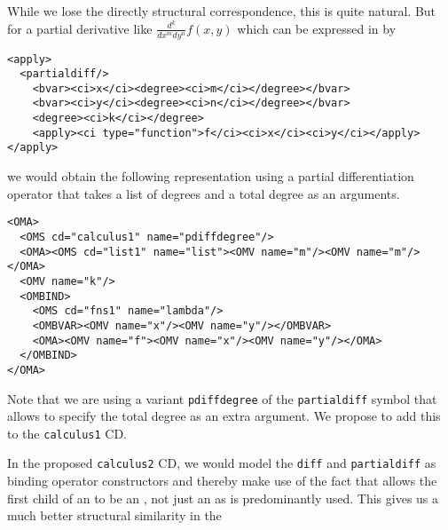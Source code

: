 \documentclass{llncs}
\begin{document}
While we lose the directly structural correspondence, this is quite natural. But for a
partial derivative like $\frac{d^k}{dx^m dy^n}f(x,y)$ which can be expressed in {\mathml}
by

\begin{lstlisting}[language=MathML2]
<apply>
  <partialdiff/>
    <bvar><ci>x</ci><degree><ci>m</ci></degree></bvar>
    <bvar><ci>y</ci><degree><ci>n</ci></degree></bvar>
    <degree><ci>k</ci></degree>
    <apply><ci type="function">f</ci><ci>x</ci><ci>y</ci></apply>
</apply>
\end{lstlisting}
we would obtain the following representation using a partial differentiation operator that
takes a list of degrees and a total degree as an arguments.
\begin{lstlisting}[language=OpenMath]
<OMA>
  <OMS cd="calculus1" name="pdiffdegree"/>
  <OMA><OMS cd="list1" name="list"><OMV name="m"/><OMV name="m"/></OMA>
  <OMV name="k"/>
  <OMBIND>
    <OMS cd="fns1" name="lambda"/>
    <OMBVAR><OMV name="x"/><OMV name="y"/></OMBVAR>
    <OMA><OMV name="f"><OMV name="x"/><OMV name="y"/></OMA>
  </OMBIND>
</OMA>
\end{lstlisting}
Note that we are using a variant {\texttt{pdiffdegree}} of the {\texttt{partialdiff}}
symbol that allows to specify the total degree as an extra argument. We propose to add
this to the {\texttt{calculus1}} CD.

In the proposed {\texttt{calculus2}} CD, we would model the {\texttt{diff}} and
{\texttt{partialdiff}} as binding operator constructors and thereby make use of the fact
that {\openmath} allows the first child of an {} to be an {},
not just an {} as is predominantly used. This gives us a much better
structural similarity in the
\end{document}
